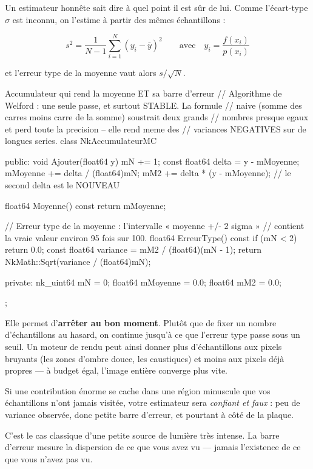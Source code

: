 Un estimateur honnête sait dire à quel point il est sûr de lui. Comme
l'écart-type $\sigma$ est inconnu, on l'estime à partir des mêmes échantillons :

\[ s^2 = \frac{1}{N-1}\sum_{i=1}^{N}\left(y_i - \bar{y}\right)^2
   \qquad\text{avec}\quad y_i = \frac{f(x_i)}{p(x_i)} \]

et l'erreur type de la moyenne vaut alors $s/\sqrt{N}$.

\begin{nkcode}{Accumulateur qui rend la moyenne ET sa barre d'erreur}
// Algorithme de Welford : une seule passe, et surtout STABLE. La formule
// naive (somme des carres moins carre de la somme) soustrait deux grands
// nombres presque egaux et perd toute la precision -- elle rend meme des
// variances NEGATIVES sur de longues series.
class NkAccumulateurMC {
    public:
        void Ajouter(float64 y) {
            mN += 1;
            const float64 delta = y - mMoyenne;
            mMoyenne += delta / (float64)mN;
            mM2 += delta * (y - mMoyenne);   // le second delta est le NOUVEAU
        }

        float64 Moyenne() const { return mMoyenne; }

        // Erreur type de la moyenne : l'intervalle « moyenne +/- 2 sigma »
        // contient la vraie valeur environ 95 fois sur 100.
        float64 ErreurType() const {
            if (mN < 2)
                return 0.0;
            const float64 variance = mM2 / (float64)(mN - 1);
            return NkMath::Sqrt(variance / (float64)mN);
        }

    private:
        nk_uint64 mN = 0;
        float64 mMoyenne = 0.0;
        float64 mM2 = 0.0;
};
\end{nkcode}

\begin{nkretenir}
Elle permet d'\textbf{arrêter au bon moment}. Plutôt que de fixer un nombre
d'échantillons au hasard, on continue jusqu'à ce que l'erreur type passe sous
un seuil. Un moteur de rendu peut ainsi donner plus d'échantillons aux pixels
bruyants (les zones d'ombre douce, les caustiques) et moins aux pixels déjà
propres — à budget égal, l'image entière converge plus vite.
\end{nkretenir}

\begin{nkpiege}
Si une contribution énorme se cache dans une région minuscule que vos
échantillons n'ont jamais visitée, votre estimateur sera \emph{confiant et
faux} : peu de variance observée, donc petite barre d'erreur, et pourtant à
côté de la plaque.

C'est le cas classique d'une petite source de lumière très intense. La barre
d'erreur mesure la dispersion de ce que vous avez vu — jamais l'existence de ce
que vous n'avez pas vu.
\end{nkpiege}

